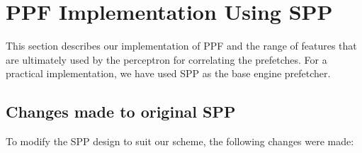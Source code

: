 \section{PPF Implementation Using SPP}
\label{Impl}

This section describes our implementation of PPF and the range of 
features that are ultimately used by the perceptron for correlating 
the prefetches.  For a practical implementation, we have used SPP 
as the base engine prefetcher.

\subsection{Changes made to original SPP}
\label{Impl-Changes}
To modify the SPP design to suit our scheme, the following changes were made:


